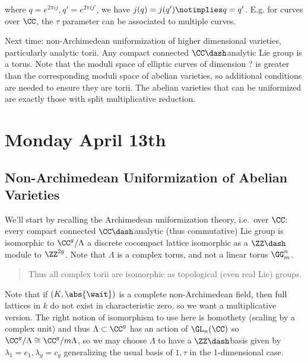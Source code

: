 where \(q = e^{2\pi i j}, q' = e^{2\pi i j'}\), we have
\(j(q) = j(q') \notimplies q = q'\). E.g. for curves over \(\CC\), the
\(\tau\) parameter can be associated to multiple curves.

Next time: non-Archimedean uniformization of higher dimensional
varieties, particularly analytic torii. Any compact connected
\(\CC\dash\)analytic Lie group is a torus. Note that the moduli space of
elliptic curves of dimension ? is greater than the corresponding moduli
space of abelian varieties, so additional conditions are needed to
ensure they are torii. The abelian varieties that can be uniformized are
exactly those with split multiplicative reduction.

\hypertarget{monday-april-13th}{%
\section{Monday April 13th}\label{monday-april-13th}}

\hypertarget{non-archimedean-uniformization-of-abelian-varieties}{%
\subsection{Non-Archimedean Uniformization of Abelian
Varieties}\label{non-archimedean-uniformization-of-abelian-varieties}}

We'll start by recalling the Archimedean uniformization theory,
i.e.~over \(\CC\): every compact connected \(\CC\dash\)analytic (thus
commutative) Lie group is isomorphic to \(\CC^g / \Lambda\) a discrete
cocompact lattice isomorphic as a \(\ZZ\dash\)module to \(\ZZ^{2g}\).
Note that \(\Lambda\) is a complex torus, and not a linear torus
\(\GG_m^n\).

\begin{quote}
Thus all complex torii are isomorphic as topological (even real Lie)
groups.
\end{quote}

Note that if \((K, \abs{\wait})\) is a complete non-Archimedean field,
then full lattices in \(k\) do not exist in characteristic zero, so we
want a multiplicative version. The right notion of isomorphism to use
here is homothety (scaling by a complex unit) and thus
\(\Lambda \subset \CC^g\) has an action of \(\GL_n(\CC)\) so
\(\CC^g/\Lambda \cong \CC^g/m \Lambda\), so we may choose \(\Lambda\) to
have a \(\ZZ\dash\)basis given by \(\lambda_1 = e_1, \lambda_g = c_g\)
generalizing the usual basis of \(1, \tau\) in the 1-dimensional case.

